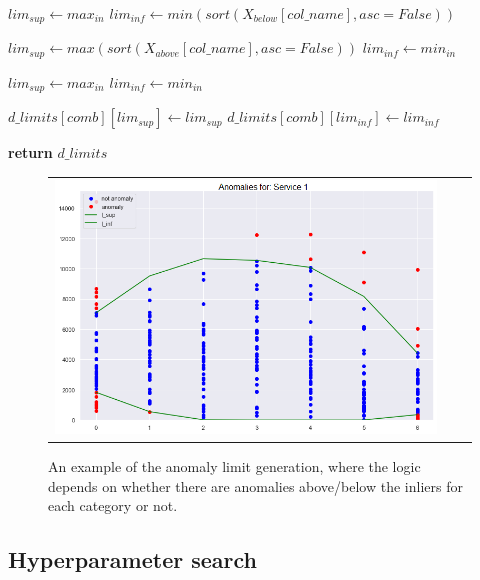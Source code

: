 \begin{algorithm}[]
\begin{algorithmic}[1]
            \State $lim_{sup} \gets max_{in}$
            \State $lim_{inf} \gets min(sort(X_{below}[col\_name], asc=False))$
        
            \State $lim_{sup} \gets max(sort(X_{above}[col\_name], asc=False))$
            \State $lim_{inf} \gets min_{in}$
        
        \Else
            \State $lim_{sup} \gets max_{in}$
            \State $lim_{inf} \gets min_{in}$
        
        \EndIf
        
    \State $d\_limits[comb][lim_{sup}] \gets lim_{sup}$
    \State $d\_limits[comb][lim_{inf}] \gets lim_{inf}$
    \EndFor

\State \textbf{return} $d\_limits$

\EndProcedure
\end{algorithmic}
\end{algorithm}

\begin{figure}[h!]
\centering
  \begin{tabular}{c@{\qquad}c@{\qquad}c}
\includegraphics[width=0.70\columnwidth]{figures/chapter5_LucaComms/AnomalyLimits_example.png}
  \end{tabular} 
  \caption{An example of the anomaly limit generation, where the logic depends on whether there are anomalies above/below the inliers for each category or not. \label{fig:ch5-anomaly-limit-example}}
\end{figure}


\subsection{Hyperparameter search}\label{subsec:ch5-HyperparamsComms}

